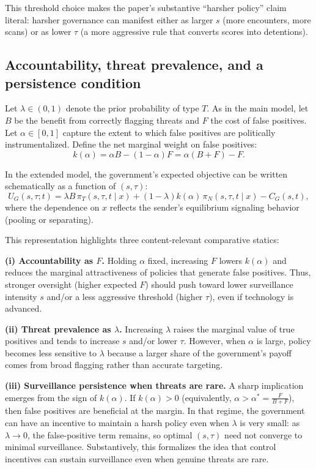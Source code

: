 \documentclass[11pt,a4paper]{article}
\theoremstyle{definition}
\theoremstyle{remark}
\theoremstyle{definition}
\begin{document}
This threshold choice makes the paper's substantive ``harsher policy'' claim literal: harsher governance can manifest either as larger $s$
(more encounters, more scans) or as lower $\tau$ (a more aggressive rule that converts scores into detentions).

\subsection{Accountability, threat prevalence, and a persistence condition}

Let $\lambda \in (0,1)$ denote the prior probability of type $T$. As in the main model, let $B$ be the benefit from correctly flagging threats and $F$
the cost of false positives. Let $\alpha \in [0,1]$ capture the extent to which false positives are politically instrumentalized. Define the net marginal
weight on false positives:
$$
k(\alpha)=\alpha B-(1-\alpha)F=\alpha(B+F)-F.
$$

In the extended model, the government's expected objective can be written schematically as a function of $(s,\tau)$:
$$
U_G(s,\tau; t)
=
\lambda B \, \pi_T(s,\tau,t \mid x)
+
(1-\lambda)k(\alpha)\,\pi_N(s,\tau,t \mid x)
-
C_G(s,t),
$$
where the dependence on $x$ reflects the sender's equilibrium signaling behavior (pooling or separating).

This representation highlights three content-relevant comparative statics:

\textbf{(i) Accountability as $F$.}
Holding $\alpha$ fixed, increasing $F$ lowers $k(\alpha)$ and reduces the marginal attractiveness of policies that generate false positives. Thus,
stronger oversight (higher expected $F$) should push toward lower surveillance intensity $s$ and/or a less aggressive threshold (higher $\tau$),
even if technology is advanced.

\textbf{(ii) Threat prevalence as $\lambda$.}
Increasing $\lambda$ raises the marginal value of true positives and tends to increase $s$ and/or lower $\tau$. However, when $\alpha$ is large,
policy becomes less sensitive to $\lambda$ because a larger share of the government's payoff comes from broad flagging rather than accurate targeting.

\textbf{(iii) Surveillance persistence when threats are rare.}
A sharp implication emerges from the sign of $k(\alpha)$. If $k(\alpha)>0$ (equivalently, $\alpha>\alpha^*=\frac{F}{B+F}$), then false positives
are beneficial at the margin. In that regime, the government can have an incentive to maintain a harsh policy even when $\lambda$ is very small:
as $\lambda \to 0$, the false-positive term remains, so optimal $(s,\tau)$ need not converge to minimal surveillance. Substantively, this formalizes
the idea that control incentives can sustain surveillance even when genuine threats are rare.
\end{document}

